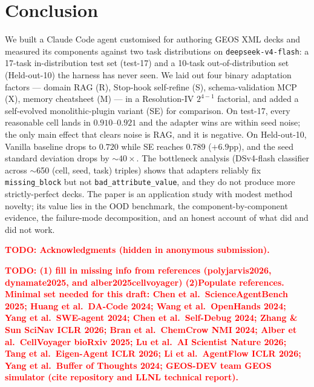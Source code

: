 \documentclass{article}
\newcommand{\todo}[1]{\textcolor{red}{\textbf{TODO: #1}}}
\begin{document}
\section{Conclusion}
\label{sec:conclusion}

We built a Claude Code agent customised for authoring GEOS XML decks and measured its components against two task distributions on \texttt{deepseek-v4-flash}: a 17-task in-distribution test set (test-17) and a 10-task out-of-distribution set (Held-out-10) the harness has never seen. We laid out four binary adaptation factors --- domain RAG (R), Stop-hook self-refine (S), schema-validation MCP (X), memory cheatsheet (M) --- in a Resolution-IV $2^{4-1}$ factorial, and added a self-evolved monolithic-plugin variant (SE) for comparison. On test-17, every reasonable cell lands in $0.910$--$0.921$ and the adapter wins are within seed noise; the only main effect that clears noise is RAG, and it is negative. On Held-out-10, Vanilla baseline drops to $0.720$ while SE reaches $0.789$ ($+6.9$pp), and the seed standard deviation drops by ${\sim}40\times$. The bottleneck analysis (DSv4-flash classifier across $\sim$650 (cell, seed, task) triples) shows that adapters reliably fix \texttt{missing\_block} but not \texttt{bad\_attribute\_value}, and they do not produce more strictly-perfect decks. The paper is an application study with modest method novelty; its value lies in the OOD benchmark, the component-by-component evidence, the failure-mode decomposition, and an honest account of what did and did not work.


\begin{ack}
\todo{Acknowledgments (hidden in anonymous submission).}
\end{ack}


\todo{(1) fill in missing info from references (polyjarvis2026, dynamate2025, and alber2025cellvoyager) (2)Populate references. Minimal set needed for this draft: Chen et al.\ ScienceAgentBench 2025; Huang et al.\ DA-Code 2024; Wang et al.\ OpenHands 2024; Yang et al.\ SWE-agent 2024; Chen et al.\ Self-Debug 2024; Zhang \& Sun SciNav ICLR 2026; Bran et al.\ ChemCrow NMI 2024; Alber et al.\ CellVoyager bioRxiv 2025; Lu et al.\ AI Scientist Nature 2026; Tang et al.\ Eigen-Agent ICLR 2026; Li et al.\ AgentFlow ICLR 2026; Yang et al.\ Buffer of Thoughts 2024; GEOS-DEV team GEOS simulator (cite repository and LLNL technical report).}

\medskip

{
\small
}


\end{document}
